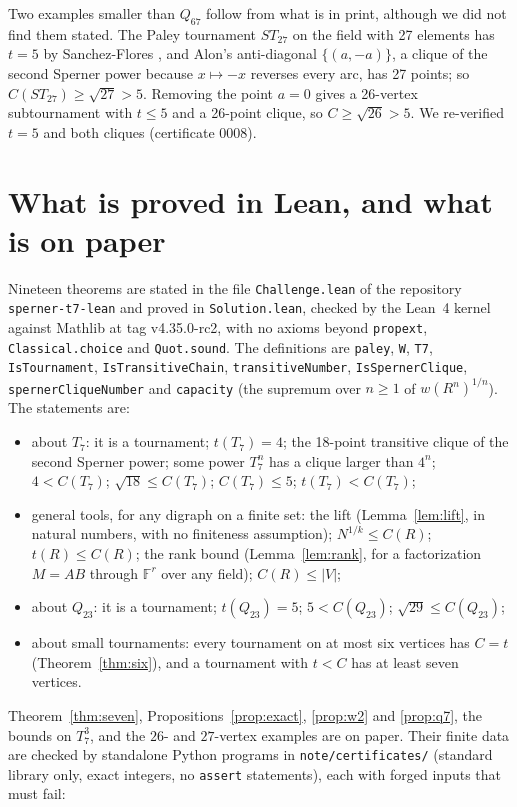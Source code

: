 \documentclass[11pt]{article}
\theoremstyle{definition}
\theoremstyle{remark}
\newcommand{\F}{\mathbb{F}}
\begin{document}
Two examples smaller than $Q_{67}$ follow from what is in print, although we did not find them stated.
The Paley tournament $ST_{27}$ on the field with 27 elements has $t = 5$ by Sanchez-Flores
\cite{sanchez}, and Alon's anti-diagonal $\{(a, -a)\}$, a clique of the second Sperner power because
$x \mapsto -x$ reverses every arc, has 27 points; so $C(ST_{27}) \ge \sqrt{27} > 5$. Removing the
point $a = 0$ gives a 26-vertex subtournament with $t \le 5$ and a 26-point clique, so
$C \ge \sqrt{26} > 5$. We re-verified $t = 5$ and both cliques (certificate 0008).

\section{What is proved in Lean, and what is on paper}\label{sec:lean}

Nineteen theorems are stated in the file \texttt{Challenge.lean} of the repository
\texttt{sperner-t7-lean} and proved in \texttt{Solution.lean}, checked by the Lean~4 kernel \cite{lean} against Mathlib
\cite{mathlib} at tag v4.35.0-rc2, with no axioms beyond \texttt{propext},
\texttt{Classical.choice} and \texttt{Quot.sound}. The definitions are
\texttt{paley}, \texttt{W}, \texttt{T7}, \texttt{IsTournament}, \texttt{IsTransitiveChain},
\texttt{transitiveNumber}, \texttt{IsSpernerClique}, \texttt{spernerCliqueNumber} and
\texttt{capacity} (the supremum over $n \ge 1$ of $w(R^n)^{1/n}$). The statements are:
\begin{itemize}
\item about $T_7$: it is a tournament; $t(T_7) = 4$; the 18-point transitive clique of the second
Sperner power; some power $T_7^n$ has a clique larger than $4^n$; $4 < C(T_7)$;
$\sqrt{18} \le C(T_7)$; $C(T_7) \le 5$; $t(T_7) < C(T_7)$;
\item general tools, for any digraph on a finite set: the lift (Lemma~\ref{lem:lift}, in natural
numbers, with no finiteness assumption); $N^{1/k} \le C(R)$; $t(R) \le C(R)$; the rank bound
(Lemma~\ref{lem:rank}, for a factorization $M = AB$ through $\F^r$ over any field);
$C(R) \le |V|$;
\item about $Q_{23}$: it is a tournament; $t(Q_{23}) = 5$; $5 < C(Q_{23})$; $\sqrt{29} \le C(Q_{23})$;
\item about small tournaments: every tournament on at most six vertices has $C = t$
(Theorem~\ref{thm:six}), and a tournament with $t < C$ has at least seven vertices.
\end{itemize}
Theorem~\ref{thm:seven}, Propositions~\ref{prop:exact}, \ref{prop:w2} and \ref{prop:q7}, the bounds on
$T_7^3$, and the $26$- and $27$-vertex examples are on paper. Their finite
data are checked by standalone Python programs in \texttt{note/certificates/} (standard library only,
exact integers, no \texttt{assert} statements), each with forged inputs that must fail:
\end{document}
